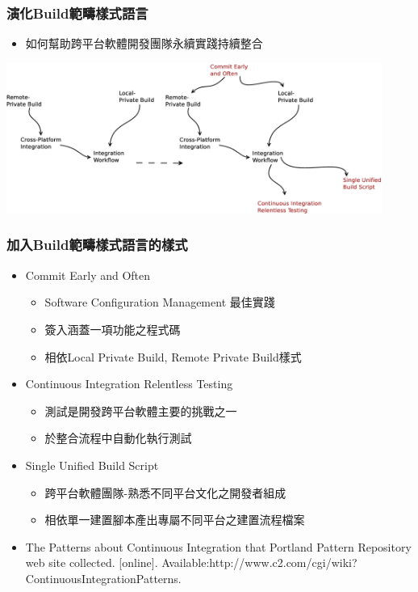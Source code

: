 \documentclass[utf8x]{beamer}
\begin{document}
\begin{frame}%
\frametitle{演化Build範疇樣式語言}
\begin{itemize}
\setlength{\itemindent}{1em}
\item[] 如何幫助跨平台軟體開發團隊永續實踐持續整合
\end{itemize}
\includegraphics[width=12.3cm]{build-catgory-pattern-language-network-revised-evo.eps}
\end{frame}

\begin{frame}
\frametitle{加入Build範疇樣式語言的樣式\dag}
\begin{itemize}
\setlength{\itemindent}{1em}
\item[] Commit Early and Often
\begin{itemize}
\item Software Configuration Management 最佳實踐
\item 簽入涵蓋一項功能之程式碼
\item 相依Local Private Build, Remote Private Build樣式
\end{itemize}
\item[] Continuous Integration Relentless Testing
\begin{itemize}
\item 測試是開發跨平台軟體主要的挑戰之一
\item 於整合流程中自動化執行測試
\end{itemize}
\item[] Single Unified Build Script
\begin{itemize}
\item 跨平台軟體團隊-熟悉不同平台文化之開發者組成
\item 相依單一建置腳本產出專屬不同平台之建置流程檔案
\end{itemize}
\fontsize{8pt}{8pt}\selectfont
\item[\dag]The Patterns about Continuous Integration that Portland Pattern Repository web site collected. [online]. Available:http://www.c2.com/cgi/wiki? ContinuousIntegrationPatterns.
\end{itemize}
\end{frame}
\end{document}
